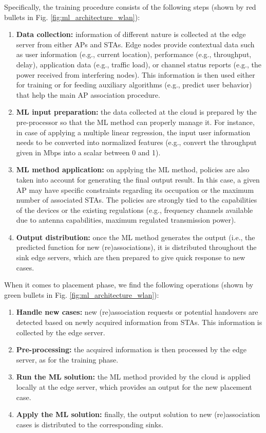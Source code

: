 \documentclass[twocolumn]{article}
\begin{document}
Specifically, the training procedure consists of the following steps (shown by red bullets in Fig. \ref{fig:ml_architecture_wlan}):
\begin{enumerate}
    \item \textbf{Data collection:} information of different nature is collected at the edge server from either APs and STAs. Edge nodes provide contextual data such as user information (e.g., current location), performance (e.g., throughput, delay), application data (e.g., traffic load), or channel status reports (e.g., the power received from interfering nodes). This information is then used either for training or for feeding auxiliary algorithms (e.g., predict user behavior) that help the main AP association procedure.
    \item \textbf{ML input preparation:} the data collected at the cloud is prepared by the pre-processor so that the ML method can properly manage it. For instance, in case of applying a multiple linear regression, the input user information needs to be converted into normalized features (e.g., convert the throughput given in Mbps into a scalar between 0 and 1).
    \item \textbf{ML method application:} on applying the ML method, policies are also taken into account for generating the final output result. In this case, a given AP may have specific constraints regarding its occupation or the maximum number of associated STAs. The policies are strongly tied to the capabilities of the devices or the existing regulations (e.g., frequency channels available due to antenna capabilities, maximum regulated transmission power).
    \item \textbf{Output distribution:} once the ML method generates the output (i.e., the predicted function for new (re)associations), it is distributed throughout the sink edge servers, which are then prepared to give quick response to new cases.
\end{enumerate}

When it comes to placement phase, we find the following operations (shown by green bullets in Fig. \ref{fig:ml_architecture_wlan}):
\begin{enumerate}
    \item \textbf{Handle new cases:} new (re)association requests or potential handovers are detected based on newly acquired information from STAs. This information is collected by the edge server.
    \item \textbf{Pre-processing:} the acquired information is then processed by the edge server, as for the training phase.
    \item \textbf{Run the ML solution:} the ML method provided by the cloud is applied locally at the edge server, which provides an output for the new placement case.
    \item \textbf{Apply the ML solution:} finally, the output solution to new (re)association cases is distributed to the corresponding sinks.
\end{enumerate}
\end{document}
